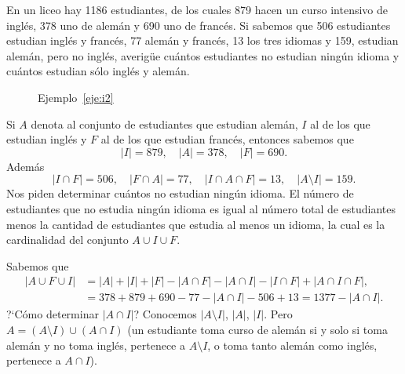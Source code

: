 \begin{ejemplo}\label{eje:i2}
	En un liceo hay 1186 estudiantes, de los cuales 879 hacen un curso intensivo de ingl\'es, 378 uno
	de alem\'an y 690 uno de franc\'es. 
	Si sabemos que 506 estudiantes estudian ingl\'es y franc\'es,
	77 alem\'an y franc\'es, 13 los tres idiomas y 159, 
	estudian alem\'an, pero no ingl\'es, averig\"ue
	cu\'antos estudiantes no estudian ning\'un idioma y 
	cu\'antos estudian s\'olo ingl\'es y alem\'an.
	
		\begin{center}
	\begin{figure}[h!]
		\begin{center}
		\end{center}
		\caption{Ejemplo~\ref{eje:i2}}
	\end{figure}
\end{center}

	
	Si $A$ denota al conjunto de estudiantes que estudian alem\'an, 
	$I$ al de los que estudian ingl\'es
	y $F$ al de los que estudian franc\'es, entonces sabemos que 
	\[
	|I| = 879,\quad |A| = 378,\quad |F| = 690.
	\]
	Adem\'as 
	\[
	|I \cap F| = 506,\quad |F \cap A| = 77,\quad |I \cap A \cap F| = 13, 
	\quad |A\setminus I| = 159.
	\]
	Nos piden determinar cu\'antos no estudian ning\'un idioma. 
	El n\'umero de estudiantes que no estudia ning\'un idioma 
	es igual al n\'umero total de estudiantes
	menos la cantidad de estudiantes que estudia al menos un idioma, la cual es la cardinalidad
	del conjunto $A \cup I \cup F$.
	
	Sabemos que 
	\begin{align*}
		|A \cup F \cup I| &= |A| + |I| + |F| - 
		|A \cap F| - |A \cap I| - |I \cap F| + |A \cap I \cap F|,\\
		&= 378 + 879 + 690 - 77 - |A \cap I| - 506 + 13 = 1377 - |A \cap I|.
	\end{align*}
	?`C\'omo determinar $|A \cap I|$? Conocemos $|A \setminus I|$, $|A|$, $|I|$. 
	Pero $A = (A\setminus I) \cup (A \cap I)$ (un estudiante
	toma curso de alem\'an si y solo si toma alem\'an y no toma ingl\'es, pertenece
	a $A \setminus I$, o toma tanto alem\'an como ingl\'es, pertenece a 
	$A \cap I$).


\end{ejemplo}
